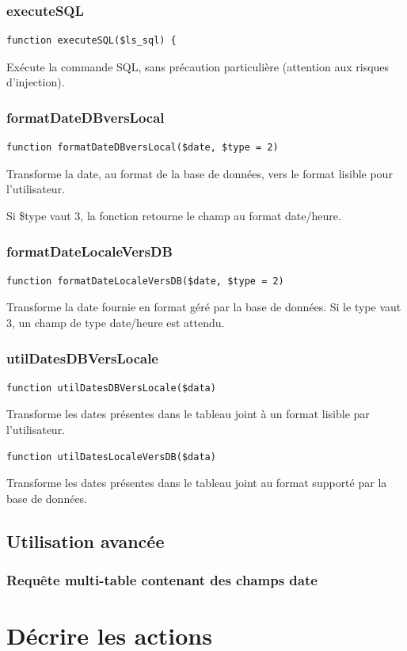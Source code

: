 \subsection{executeSQL}

\begin{lstlisting}
function executeSQL($ls_sql) {
\end{lstlisting}

Exécute la commande SQL, sans précaution particulière (attention aux risques d'injection).

\subsection{formatDateDBversLocal}

\begin{lstlisting}
function formatDateDBversLocal($date, $type = 2)
\end{lstlisting}

Transforme la date, au format de la base de données, vers le format lisible pour l'utilisateur.

Si \$type vaut 3, la fonction retourne le champ au format date/heure.

\subsection{formatDateLocaleVersDB}
\begin{lstlisting}
function formatDateLocaleVersDB($date, $type = 2)
\end{lstlisting}

Transforme la date fournie en format géré par la base de données. Si le type vaut 3, un champ de type date/heure est attendu.

\subsection{utilDatesDBVersLocale}
\begin{lstlisting}
function utilDatesDBVersLocale($data)
\end{lstlisting}

Transforme les dates présentes dans le tableau joint à un format lisible par l'utilisateur.

\begin{lstlisting}
function utilDatesLocaleVersDB($data)
\end{lstlisting}

Transforme les dates présentes dans le tableau joint au format supporté par la base de données.

\section{Utilisation avancée}
\subsection{Requête multi-table contenant des champs date}


\chapter{Décrire les actions}